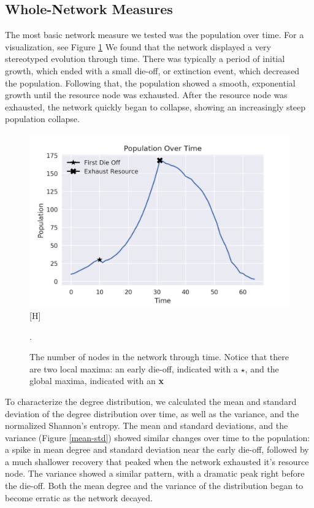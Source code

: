 \documentclass{paper}
\begin{document}
	
	\subsection{Whole-Network Measures}
	The most basic network measure we tested was the population over time. For a visualization, see Figure \ref{population} We found that the network displayed a very stereotyped evolution through time. There was typically a period of initial growth, which ended with a small die-off, or extinction event, which decreased the population. Following that, the population showed a smooth, exponential growth until the resource node was exhausted. After the resource node was exhausted, the network quickly began to collapse, showing an increasingly steep population collapse. 
		
		\begin{figure}[h]
			\centering
			\includegraphics[scale=0.75]{population.png}[H]
			\caption{The number of nodes in the network through time. Notice that there are two local maxima: an early die-off, indicated with a $\star$, and the global maxima, indicated with an \textbf{\textsf{x}}}.
			\label{population}
		\end{figure}
	
	To characterize the degree distribution, we calculated the mean and standard deviation of the degree distribution over time, as well as the variance, and the normalized Shannon's entropy. The mean and standard deviations, and the variance (Figure \ref{mean-std}) showed similar changes over time to the population: a spike in mean degree and standard deviation near the early die-off, followed by a much shallower recovery that peaked when the network exhausted it's resource node. The variance showed a similar pattern, with a dramatic peak right before the die-off. Both the mean degree and the variance of the distribution began to become erratic as the network decayed. 
	
\end{document}
